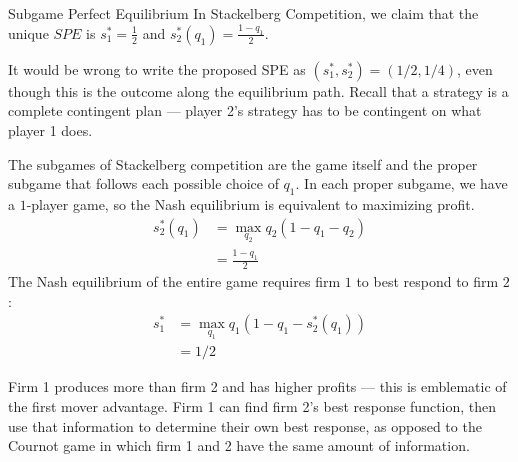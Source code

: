 \documentclass[10pt]{extarticle}
\begin{document}
\begin{problem}{Subgame Perfect Equilibrium}
    In Stackelberg Competition, we claim that the unique $SPE$ is $s_1^* = \frac{1}{2}$ and $s_2^*(q_1) = \frac{1-q_1}{2}$.
    \begin{description}
      \small
      \item[Note:] It would be wrong to write the proposed SPE as $(s_1^*,s_2^*) = (1/2,1/4)$, even though this is the outcome along the equilibrium path. Recall that a strategy is a complete contingent plan --- player 2's strategy has to be contingent on what player 1 does.
    \end{description}
    The subgames of Stackelberg competition are the game itself and the proper subgame that follows each possible choice of $q_1$. In each proper subgame, we have a $1$-player game, so the Nash equilibrium is equivalent to maximizing profit.
    \begin{align*}
      s_2^*(q_1) &= \max_{q_2}q_2(1-q_1-q_2)\\
                 &= \frac{1-q_1}{2}
    \end{align*}
    The Nash equilibrium of the entire game requires firm $1$ to best respond to firm $2$:
    \begin{align*}
      s_1^* &= \max_{q_1}q_1(1-q_1-s_2^*(q_1))\\
            &= 1/2
    \end{align*}
    \begin{description}
      \small
      \item[Note:] Firm 1 produces more than firm 2 and has higher profits --- this is emblematic of the first mover advantage. Firm 1 can find firm 2's best response function, then use that information to determine their own best response, as opposed to the Cournot game in which firm 1 and 2 have the same amount of information.
    \end{description}
  \end{problem}
\end{document}
